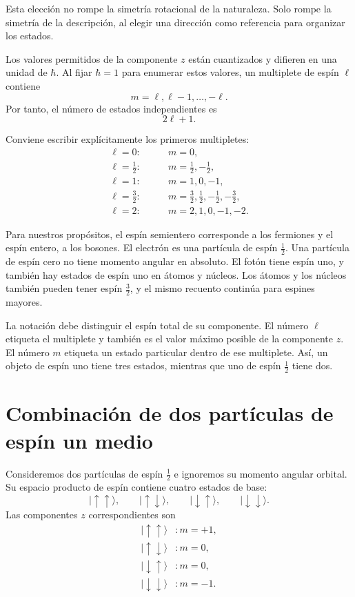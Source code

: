 Esta elección no rompe la simetría rotacional de la naturaleza. Solo rompe la simetría de la descripción, al elegir una dirección como referencia para organizar los estados.

Los valores permitidos de la componente \(z\) están cuantizados y difieren en una unidad de \(\hbar\). Al fijar \(\hbar=1\) para enumerar estos valores, un multiplete de espín \(\ell\) contiene
\begin{equation}
m=\ell,\ell-1,\ldots,-\ell.
\end{equation}
Por tanto, el número de estados independientes es
\begin{equation}
2\ell+1.
\end{equation}

Conviene escribir explícitamente los primeros multipletes:
\begin{align}
\ell=0:&\qquad m=0,\\
\ell=\frac12:&\qquad m=\frac12,-\frac12,\\
\ell=1:&\qquad m=1,0,-1,\\
\ell=\frac32:&\qquad
m=\frac32,\frac12,-\frac12,-\frac32,\\
\ell=2:&\qquad m=2,1,0,-1,-2.
\end{align}

Para nuestros propósitos, el espín semientero corresponde a los fermiones y el espín entero, a los bosones. El electrón es una partícula de espín \(\tfrac12\). Una partícula de espín cero no tiene momento angular en absoluto. El fotón tiene espín uno, y también hay estados de espín uno en átomos y núcleos. Los átomos y los núcleos también pueden tener espín \(\tfrac32\), y el mismo recuento continúa para espines mayores.

La notación debe distinguir el espín total de su componente. El número \(\ell\) etiqueta el multiplete y también es el valor máximo posible de la componente \(z\). El número \(m\) etiqueta un estado particular dentro de ese multiplete. Así, un objeto de espín uno tiene tres estados, mientras que uno de espín \(\tfrac12\) tiene dos.

\section{Combinación de dos partículas de espín un medio}

Consideremos dos partículas de espín \(\tfrac12\) e ignoremos su momento angular orbital. Su espacio producto de espín contiene cuatro estados de base:
\begin{equation}
|\uparrow\uparrow\rangle,\qquad
|\uparrow\downarrow\rangle,\qquad
|\downarrow\uparrow\rangle,\qquad
|\downarrow\downarrow\rangle.
\end{equation}
Las componentes \(z\) correspondientes son
\begin{align}
|\uparrow\uparrow\rangle &: m=+1,\\
|\uparrow\downarrow\rangle &: m=0,\\
|\downarrow\uparrow\rangle &: m=0,\\
|\downarrow\downarrow\rangle &: m=-1.
\end{align}

